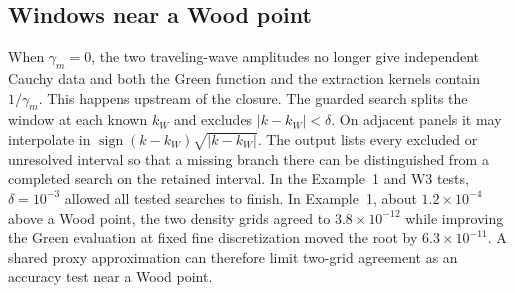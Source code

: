 \subsection{Windows near a Wood point}\label{sec:wood}
When $\gamma_m=0$, the two traveling-wave amplitudes no longer give
independent Cauchy data and both the Green function and the extraction
kernels contain $1/\gamma_m$. This happens upstream of the closure.
The guarded search splits the window at each known $k_W$ and excludes
$|k-k_W|<\delta$. On adjacent panels it may interpolate in
$\operatorname{sign}(k-k_W)\sqrt{|k-k_W|}$. The output lists every
excluded or unresolved interval so that a missing branch there can be
distinguished from a completed search on the retained interval.
In the Example~1 and W3 tests, $\delta=10^{-3}$ allowed all tested searches
to finish. In Example~1, about $1.2\times10^{-4}$ above a Wood point, the
two density grids agreed to $3.8\times10^{-12}$ while improving the Green
evaluation at fixed fine discretization moved the root by
$6.3\times10^{-11}$. A shared proxy approximation can therefore limit two-grid
agreement as an accuracy test near a Wood point.
